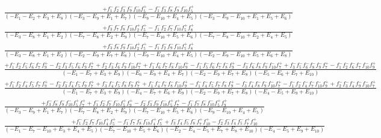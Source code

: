 \documentclass{article}
\begin{document}
\[\begin{array}{rcl}
\frac{+f_{1}^{-}f_{2}^{-}f_{3}^{-}f_{9}^{-}f_{10}^{-}f_{5}^{+}-f_{1}^{-}f_{3}^{-}f_{8}^{-}f_{9}^{-}f_{10}^{-}f_{5}^{+}}{(-E_{1}-E_{2}+E_{3}+E_{8})(-E_{3}-E_{9}+E_{1}+E_{7})(-E_{9}-E_{10}+E_{4}+E_{5})(-E_{3}-E_{9}-E_{10}+E_{1}+E_{5}+E_{6})}\\
\frac{+f_{3}^{-}f_{7}^{-}f_{8}^{-}f_{10}^{-}f_{2}^{+}f_{5}^{+}-f_{1}^{-}f_{2}^{-}f_{7}^{-}f_{10}^{-}f_{5}^{+}f_{8}^{+}}{(-E_{3}-E_{8}+E_{1}+E_{2})(-E_{7}-E_{8}+E_{2}+E_{9})(-E_{7}-E_{10}+E_{5}+E_{6})(-E_{7}-E_{8}-E_{10}+E_{2}+E_{4}+E_{5})}\\
\frac{+f_{3}^{-}f_{8}^{-}f_{9}^{-}f_{10}^{-}f_{2}^{+}f_{5}^{+}-f_{1}^{-}f_{2}^{-}f_{9}^{-}f_{10}^{-}f_{5}^{+}f_{8}^{+}}{(-E_{3}-E_{8}+E_{1}+E_{2})(-E_{2}-E_{9}+E_{7}+E_{8})(-E_{9}-E_{10}+E_{4}+E_{5})(-E_{2}-E_{9}-E_{10}+E_{5}+E_{6}+E_{8})}\\
\frac{+f_{1}^{-}f_{2}^{-}f_{5}^{-}f_{6}^{-}f_{7}^{-}f_{9}^{+}-f_{2}^{-}f_{3}^{-}f_{5}^{-}f_{6}^{-}f_{9}^{-}f_{7}^{+}+f_{2}^{-}f_{3}^{-}f_{6}^{-}f_{9}^{-}f_{10}^{-}f_{7}^{+}+f_{1}^{-}f_{6}^{-}f_{7}^{-}f_{8}^{-}f_{10}^{-}f_{9}^{+}-f_{1}^{-}f_{5}^{-}f_{6}^{-}f_{7}^{-}f_{8}^{-}f_{9}^{+}-f_{3}^{-}f_{6}^{-}f_{8}^{-}f_{9}^{-}f_{10}^{-}f_{7}^{+}+f_{3}^{-}f_{5}^{-}f_{6}^{-}f_{8}^{-}f_{9}^{-}f_{7}^{+}-f_{1}^{-}f_{2}^{-}f_{6}^{-}f_{7}^{-}f_{10}^{-}f_{9}^{+}}{(-E_{1}-E_{7}+E_{3}+E_{9})(-E_{6}-E_{9}+E_{4}+E_{7})(-E_{2}-E_{9}+E_{7}+E_{8})(-E_{5}-E_{6}+E_{7}+E_{10})}\\
\frac{+f_{1}^{-}f_{2}^{-}f_{4}^{-}f_{5}^{-}f_{7}^{-}f_{9}^{+}-f_{2}^{-}f_{3}^{-}f_{4}^{-}f_{5}^{-}f_{9}^{-}f_{7}^{+}+f_{3}^{-}f_{4}^{-}f_{5}^{-}f_{8}^{-}f_{9}^{-}f_{7}^{+}+f_{1}^{-}f_{4}^{-}f_{7}^{-}f_{8}^{-}f_{10}^{-}f_{9}^{+}-f_{1}^{-}f_{4}^{-}f_{5}^{-}f_{7}^{-}f_{8}^{-}f_{9}^{+}-f_{3}^{-}f_{4}^{-}f_{8}^{-}f_{9}^{-}f_{10}^{-}f_{7}^{+}-f_{1}^{-}f_{2}^{-}f_{4}^{-}f_{7}^{-}f_{10}^{-}f_{9}^{+}+f_{2}^{-}f_{3}^{-}f_{4}^{-}f_{9}^{-}f_{10}^{-}f_{7}^{+}}{(-E_{1}-E_{7}+E_{3}+E_{9})(-E_{4}-E_{7}+E_{6}+E_{9})(-E_{2}-E_{9}+E_{7}+E_{8})(-E_{4}-E_{5}+E_{9}+E_{10})}\\
\frac{+f_{3}^{-}f_{8}^{-}f_{9}^{-}f_{10}^{-}f_{5}^{+}f_{7}^{+}+f_{1}^{-}f_{2}^{-}f_{7}^{-}f_{10}^{-}f_{5}^{+}f_{9}^{+}-f_{2}^{-}f_{3}^{-}f_{9}^{-}f_{10}^{-}f_{5}^{+}f_{7}^{+}-f_{1}^{-}f_{7}^{-}f_{8}^{-}f_{10}^{-}f_{5}^{+}f_{9}^{+}}{(-E_{3}-E_{9}+E_{1}+E_{7})(-E_{7}-E_{8}+E_{2}+E_{9})(-E_{7}-E_{10}+E_{5}+E_{6})(-E_{9}-E_{10}+E_{4}+E_{5})}\\
\frac{+f_{1}^{-}f_{2}^{-}f_{7}^{-}f_{10}^{-}f_{4}^{+}f_{5}^{+}-f_{1}^{-}f_{7}^{-}f_{8}^{-}f_{10}^{-}f_{4}^{+}f_{5}^{+}+f_{3}^{-}f_{4}^{-}f_{5}^{-}f_{8}^{-}f_{7}^{+}f_{10}^{+}-f_{2}^{-}f_{3}^{-}f_{4}^{-}f_{5}^{-}f_{7}^{+}f_{10}^{+}}{(-E_{1}-E_{7}-E_{10}+E_{3}+E_{4}+E_{5})(-E_{7}-E_{10}+E_{5}+E_{6})(-E_{2}-E_{4}-E_{5}+E_{7}+E_{8}+E_{10})(-E_{4}-E_{5}+E_{9}+E_{10})}\\

\end{array}\]
\end{document}
